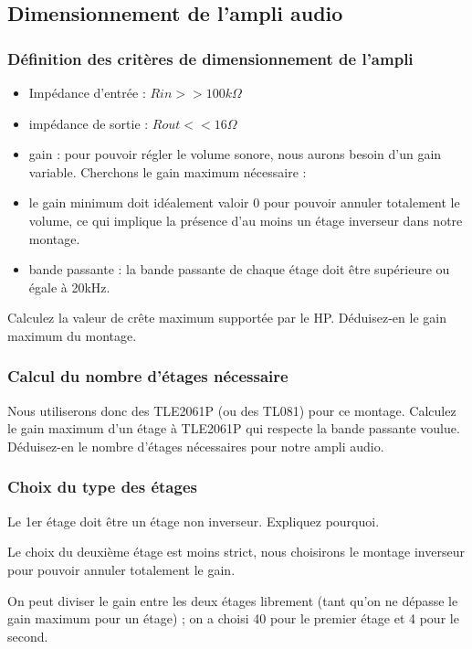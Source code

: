 \documentclass{../template/labo}
\begin{document}
\subsection{Dimensionnement de l'ampli audio}
\label{Dimensionnement}

\subsubsection{Définition des critères de dimensionnement de l'ampli}

\begin{itemize}
\item Impédance d'entrée : $Rin >> 100k\Omega$
\item impédance de sortie : $Rout << 16\Omega$
\item gain : pour pouvoir régler le volume sonore, nous aurons besoin d'un gain variable. Cherchons le gain maximum nécessaire :
\item le gain minimum doit idéalement valoir 0 pour pouvoir annuler totalement le volume, ce qui implique la présence d'au moins un étage inverseur dans notre montage.
\item bande passante : la bande passante de chaque étage doit être supérieure ou égale à 20kHz.
\end{itemize}

\Question
{
Calculez la valeur de crête maximum supportée par le HP.
}
{}
\Question
{
Déduisez-en le gain maximum du montage.
}
{}

\subsubsection{Calcul du nombre d'étages nécessaire}
Nous utiliserons donc des TLE2061P (ou des TL081) pour ce montage.
\Question
{
Calculez le gain maximum d'un étage à TLE2061P qui respecte la bande passante voulue.
}
{}
\Question
{
Déduisez-en le nombre d'étages nécessaires pour notre ampli audio.
}
{}


\subsubsection{Choix du type des étages}
\Question
{
Le 1er étage doit être un étage non inverseur. Expliquez pourquoi.
}
{}

Le choix du deuxième étage est moins strict, nous choisirons le montage inverseur pour pouvoir annuler totalement le gain.

On peut diviser le gain entre les deux étages librement (tant qu'on ne dépasse le gain maximum pour un étage) ; on a choisi 40 pour le premier étage et 4 pour le second.
\end{document}
